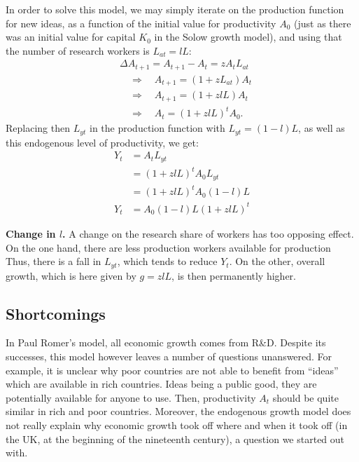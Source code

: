 \documentclass[]{book}
\theoremstyle{definition}
\theoremstyle{definition}
\theoremstyle{definition}
\theoremstyle{remark}
\begin{document}
In order to solve this model, we may simply iterate on the production
function for new ideas, as a function of the initial value for
productivity \(A_0\) (just as there was an initial value for capital
\(K_0\) in the Solow growth model), and using that the number of
research workers is \(L_{at} = l L\): \[
\begin{aligned}
& \Delta A_{t+1} = A_{t+1}-A_t =z A_{t} L_{at}\\
& \quad \Rightarrow \quad  A_{t+1} = (1+z L_{at})A_{t} \\
& \quad \Rightarrow \quad  A_{t+1}=\left(1+zlL\right)A_{t}\\
& \quad \Rightarrow \quad  A_{t}=\left(1+zlL\right)^{t}A_{0}.
\end{aligned}
\] Replacing then \(L_{yt}\) in the production function with
\(L_{yt} = (1-l)L\), as well as this endogenous level of productivity,
we get: \[
\begin{aligned}
Y_{t}&  =A_{t} L_{yt}\\
&= \left(1+zlL\right)^{t}A_{0}L_{yt}\\
&= \left(1+zlL\right)^{t}A_{0}(1-l)L\\
Y_{t}&= A_{0}(1-l)L \left(1+zlL\right)^{t}
\end{aligned}
\]

\textbf{Change in \(l\).} A change on the research share of workers has
too opposing effect. On the one hand, there are less production workers
available for production Thus, there is a fall in \(L_{yt}\), which
tends to reduce \(Y_t\). On the other, overall growth, which is here
given by \(g = zlL\), is then permanently higher.

\subsection{Shortcomings}\label{shortcomings}

In Paul Romer's model, all economic growth comes from R\&D. Despite its
successes, this model however leaves a number of questions unanswered.
For example, it is unclear why poor countries are not able to benefit
from ``ideas'' which are available in rich countries. Ideas being a
public good, they are potentially available for anyone to use. Then,
productivity \(A_t\) should be quite similar in rich and poor countries.
Moreover, the endogenous growth model does not really explain why
economic growth took off where and when it took off (in the UK, at the
beginning of the nineteenth century), a question we started out with.
\end{document}
